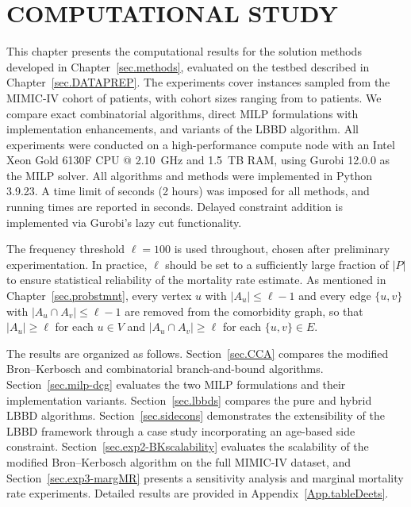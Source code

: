\begingroup
\clearpage
\let\clearpage\relax
\vspace*{-16pt}
\chapter[COMPUTATIONAL STUDY]{COMPUTATIONAL STUDY}\label{sec.results}
\endgroup

This chapter presents the computational results for the solution
methods developed in Chapter~\ref{sec.methods}, evaluated on the testbed described in Chapter~\ref{sec.DATAPREP}. The experiments cover
instances sampled from the MIMIC-IV cohort of 
patients, with cohort sizes ranging from  to
 patients. We compare exact combinatorial algorithms,
direct MILP formulations with implementation enhancements, and
variants of the LBBD algorithm. All experiments were conducted on a high-performance compute node with an Intel Xeon Gold 6130F CPU @ 2.10~GHz and 1.5~TB RAM, using Gurobi 12.0.0 as the MILP solver. All algorithms and methods were implemented in Python 3.9.23. A time limit of  seconds (2 hours) was imposed for all methods, and running times are reported in seconds. Delayed constraint addition is implemented via Gurobi's lazy cut functionality.

The frequency threshold $\ell = 100$ is used throughout, chosen after
preliminary experimentation. In practice, $\ell$ should be set to a
sufficiently large fraction of $|P|$ to ensure statistical reliability
of the mortality rate estimate. As mentioned in Chapter~\ref{sec.probstmnt}, every vertex
$u$ with $|A_u| \le \ell - 1$ and every edge $\{u,v\}$ with
$|A_u \cap A_v| \le \ell - 1$ are removed from the comorbidity graph,
so that $|A_u| \ge \ell$ for each $u \in V$ and
$|A_u \cap A_v| \ge \ell$ for each $\{u,v\} \in E$.

The results are organized as follows. Section~\ref{sec.CCA} compares
the modified Bron--Kerbosch and combinatorial branch-and-bound
algorithms. Section~\ref{sec.milp-dcg} evaluates the two MILP
formulations and their implementation variants.
Section~\ref{sec.lbbds} compares the pure and hybrid LBBD algorithms.
Section~\ref{sec.sidecons} demonstrates the extensibility of the LBBD
framework through a case study incorporating an age-based side
constraint. Section~\ref{sec.exp2-BKscalability} evaluates the
scalability of the modified Bron--Kerbosch algorithm on the full
MIMIC-IV dataset, and Section~\ref{sec.exp3-margMR} presents a
sensitivity analysis and marginal mortality rate experiments. Detailed
results are provided in Appendix~\ref{App.tableDeets}.

